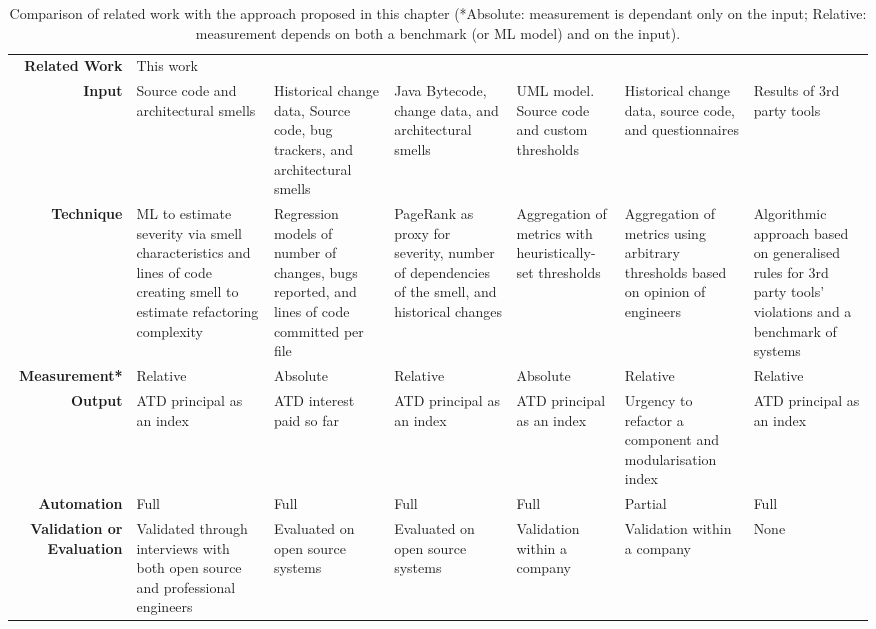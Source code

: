 \begin{sidewaystable}[]
    \scriptsize
    \centering
    \caption{Comparison of related work with the approach proposed in this chapter (*Absolute: measurement is dependant only on the input; Relative: measurement depends on both a benchmark (or ML model) and on the input).}
    \label{c6:tab:rw-comparison}
    \begin{tabular}{r|m{2.5cm}m{2.5cm}m{2.5cm}m{2.5cm}m{2.5cm}m{2.5cm}}
    \hline
    \textbf{Related Work} & This work & \cite{Xiao2016} & \cite{Roveda2018} & \cite{Martini2018b} & \cite{Wu2018} & \cite{Verdecchia2020} \\
    \textbf{Input} & Source code and architectural smells & Historical change data, Source code, bug trackers, and architectural smells & Java Bytecode, change data, and architectural smells & UML model. Source code and custom thresholds & Historical change data, source code, and questionnaires & Results of 3rd party tools \\
    \textbf{Technique} & ML to estimate severity via smell characteristics and lines of code creating smell to estimate refactoring complexity & Regression models of number of changes, bugs reported, and lines of code committed per file & PageRank as proxy for severity, number of dependencies of the smell, and historical changes & Aggregation of metrics with heuristically-set thresholds & Aggregation of metrics using arbitrary thresholds based on opinion of engineers & Algorithmic approach based on generalised rules for 3rd party tools' violations and a benchmark of systems \\
    \textbf{Measurement*} & Relative & Absolute & Relative & Absolute & Relative & Relative \\
    \textbf{Output} & ATD principal as an index & ATD interest paid so far & ATD principal as an index & ATD principal as an index & Urgency to refactor a component and modularisation index & ATD principal as an index \\
    \textbf{Automation} & Full & Full & Full & Full & Partial & Full \\
    \textbf{Validation or Evaluation} & Validated through interviews with both open source and professional engineers & Evaluated on open source systems & Evaluated on open source systems & Validation within a company & Validation within a company & None \\ \hline
    \end{tabular}
\end{sidewaystable}

